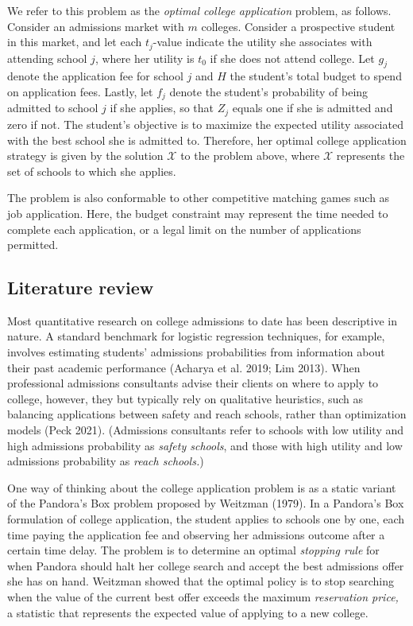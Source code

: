 \documentclass[11pt]{article} %
\theoremstyle{definition}
\begin{document}
We refer to this problem as the \emph{optimal college application} problem, as follows. Consider an admissions market with $m$ colleges. Consider a prospective student in this market, and let each $t_j$-value indicate the utility she associates with attending school $j$, where her utility is $t_0$ if she does not attend college. Let $g_j$ denote the application fee for school $j$ and $H$ the student's total budget to spend on application fees. Lastly, let $f_j$ denote the student's probability of being admitted to school $j$ if she applies, so that $Z_j$ equals one if she is admitted and zero if not. The student's objective is to maximize the expected utility associated with the best school she is admitted to. Therefore, her optimal college application strategy is given by the solution $\mathcal{X}$ to the problem above, where $\mathcal{X}$ represents the set of schools to which she applies. 

The problem is also conformable to other competitive matching games such as job application. Here, the budget constraint may represent the time needed to complete each application, or a legal limit on the number of applications permitted.

\subsection{Literature review}

Most quantitative research on college admissions to date has been descriptive in nature. A standard benchmark for logistic regression techniques, for example, involves estimating students' admissions probabilities from information about their past academic performance (Acharya et al. 2019; Lim 2013). When professional admissions consultants advise their clients on where to apply to college, however, they but typically rely on qualitative heuristics, such as balancing applications between safety and reach schools, rather than optimization models (Peck 2021). (Admissions consultants refer to schools with low utility and high admissions probability as \emph{safety schools}, and those with high utility and low admissions probability as \emph{reach schools.})

One way of thinking about the college application problem is as a static variant of the Pandora's Box problem proposed by Weitzman (1979). In a Pandora's Box formulation of college application, the student applies to schools one by one, each time paying the application fee and observing her admissions outcome after a certain time delay. The problem is to determine an optimal \emph{stopping rule} for when Pandora should halt her college search and accept the best admissions offer she has on hand. Weitzman showed that the optimal policy is to stop searching when the value of the current best offer exceeds the maximum \emph{reservation price,} a statistic that represents the expected value of applying to a new college.
\end{document}

